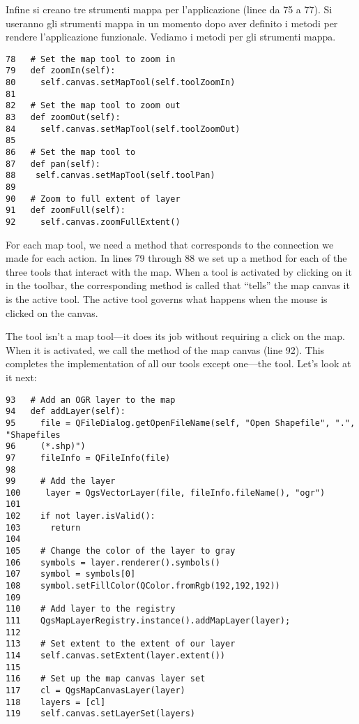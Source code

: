 Infine si creano tre strumenti mappa per l'applicazione (linee da 75 a
77). Si useranno gli strumenti mappa in un momento dopo aver definito i metodi per rendere l'applicazione funzionale. Vediamo i metodi per gli strumenti mappa.

\begin{verbatim}
78   # Set the map tool to zoom in
79   def zoomIn(self):
80     self.canvas.setMapTool(self.toolZoomIn)
81 
82   # Set the map tool to zoom out
83   def zoomOut(self):
84     self.canvas.setMapTool(self.toolZoomOut)
85 
86   # Set the map tool to 
87   def pan(self):
88    self.canvas.setMapTool(self.toolPan)
89 
90   # Zoom to full extent of layer
91   def zoomFull(self):
92     self.canvas.zoomFullExtent()
\end{verbatim}

For each map tool, we need a method that corresponds to the connection we made
for each action. In lines 79 through 88 we set up a method for each of the
  three tools that interact with the map. When a tool is activated by clicking
  on it in the toolbar, the corresponding method is called that ``tells'' the
  map canvas it is the active tool. The active tool governs what happens when
  the mouse is clicked on the canvas.

The  tool isn't a map tool---it does its job
without requiring a click on the map. When it is activated, we call the
 method of the map canvas (line 92).  This completes
the implementation of all our tools except one---the 
tool. %
Let's look at it next:

\begin{verbatim}
93   # Add an OGR layer to the map
94   def addLayer(self):
95     file = QFileDialog.getOpenFileName(self, "Open Shapefile", ".", "Shapefiles
96     (*.shp)")
97     fileInfo = QFileInfo(file)
98 
99     # Add the layer
100     layer = QgsVectorLayer(file, fileInfo.fileName(), "ogr")
101
102    if not layer.isValid():
103      return
104
105    # Change the color of the layer to gray
106    symbols = layer.renderer().symbols()
107    symbol = symbols[0]
108    symbol.setFillColor(QColor.fromRgb(192,192,192))
109
110    # Add layer to the registry
111    QgsMapLayerRegistry.instance().addMapLayer(layer);
112
113    # Set extent to the extent of our layer
114    self.canvas.setExtent(layer.extent())
115
116    # Set up the map canvas layer set
117    cl = QgsMapCanvasLayer(layer)
118    layers = [cl]
119    self.canvas.setLayerSet(layers)
\end{verbatim}

